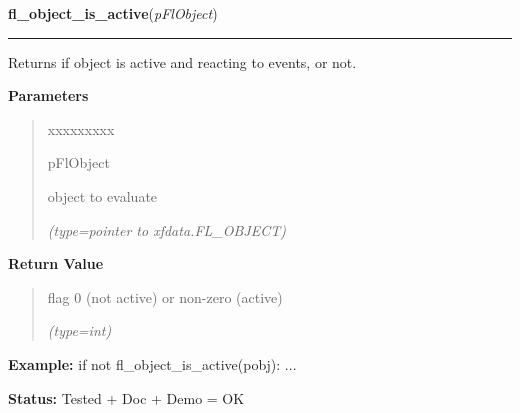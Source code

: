 \hspace{.8\funcindent}\begin{boxedminipage}{\funcwidth}

    \raggedright \textbf{fl\_object\_is\_active}(\textit{pFlObject})

    \vspace{-1.5ex}

    \rule{\textwidth}{0.5\fboxrule}
\setlength{\parskip}{2ex}
    Returns if object is active and reacting to events, or not.

\setlength{\parskip}{1ex}
      \textbf{Parameters}
      \vspace{-1ex}

      \begin{quote}
        \begin{Ventry}{xxxxxxxxx}

          \item[pFlObject]

          object to evaluate

            {\it (type=pointer to xfdata.FL\_OBJECT)}

        \end{Ventry}

      \end{quote}

      \textbf{Return Value}
    \vspace{-1ex}

      \begin{quote}
      flag 0 (not active) or non-zero (active)

      {\it (type=int)}

      \end{quote}

\textbf{Example:} if not fl\_object\_is\_active(pobj): ...



\textbf{Status:} Tested + Doc + Demo = OK



    \end{boxedminipage}

    \label{xformslib:flbasic:fl_enumerate_fonts}

    \vspace{0.5ex}

